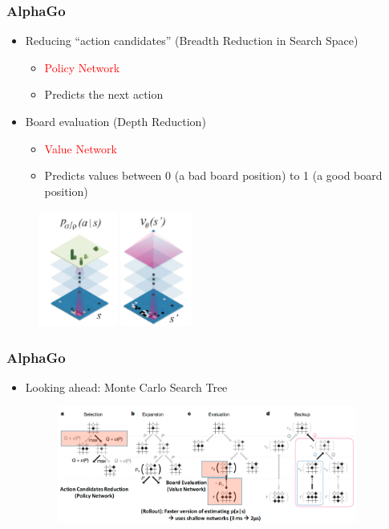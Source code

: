 \documentclass{beamer}
\newcommand{\tr}[1]{\textcolor{red}{#1}} %
\begin{document}
\begin{frame}
\frametitle{AlphaGo}
\begin{itemize}
\item Reducing ``action candidates'' (Breadth Reduction in Search Space)
\begin{itemize}
\item \tr{Policy Network}
\item Predicts the next action 
\end{itemize}
\item Board evaluation (Depth Reduction)
\begin{itemize}
\item \tr{Value Network}
\item Predicts values between 0 (a bad board position) to 1 (a good board position) 
\end{itemize}
\end{itemize}
\begin{figure}
      \includegraphics[width=0.23\textwidth]{figs/alphago6.png}
      \hspace{0.3in}
      \includegraphics[width=0.21\textwidth]{figs/alphago7.png}
\end{figure}
\end{frame}

\begin{frame}
\frametitle{AlphaGo}
\begin{itemize}
\item Looking ahead: Monte Carlo Search Tree
\vspace{0.1in}
\begin{figure}
      \includegraphics[width=0.93\textwidth]{figs/alphago8.png}
\end{figure}
\end{itemize}
\end{frame}
\end{document}
